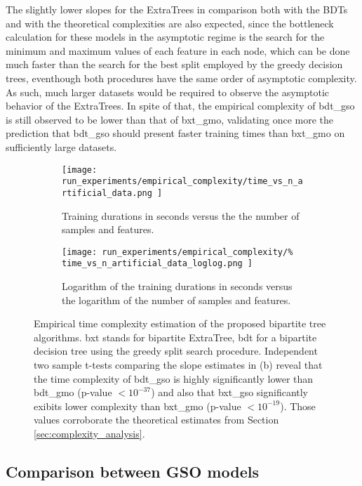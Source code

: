 The slightly lower slopes for the ExtraTrees in comparison both with the BDTs and with the theoretical complexities are also expected, since the bottleneck calculation for these models in the asymptotic regime is the search for the minimum and maximum values of each feature in each node, which can be done much faster than the search for the best split employed by the greedy decision trees, eventhough both procedures have the same order of asymptotic complexity. As such, much larger datasets would be required to observe the asymptotic behavior of the ExtraTrees. In spite of that, the empirical complexity of bdt\_gso is still observed to be lower than that of bxt\_gmo, validating once more the prediction that bdt\_gso should present faster training times than bxt\_gmo on sufficiently large datasets.

\begin{figure}[h]
    \centering
    \begin{subfigure}{0.5\textwidth}
        \texttt{[image: 
            run\_experiments/empirical\_complexity/time\_vs\_n\_artificial\_data.png
        ]}
        \caption{Training durations in seconds versus the the number of samples and features.}
    \end{subfigure}
    \begin{subfigure}{0.5\textwidth}
        \texttt{[image: 
            run\_experiments/empirical\_complexity/\%
            time\_vs\_n\_artificial\_data\_loglog.png
        ]}
        \caption{Logarithm of the training durations in seconds versus the logarithm of the number of samples and features.}
    \end{subfigure}
    \caption{
        Empirical time complexity estimation of the proposed bipartite tree
        algorithms. bxt stands for bipartite ExtraTree, bdt for a bipartite decision tree using the greedy split search procedure. Independent two sample t-tests comparing the slope estimates in (b) reveal that the time complexity of bdt\_gso is highly significantly lower than bdt\_gmo (p-value $< 10^{-37}$) and also that bxt\_gso significantly exibits lower complexity than bxt\_gmo (p-value $< 10^{-19}$). Those values
        corroborate the theoretical estimates from Section \ref{sec:complexity_analysis}.
    }
    \label{fig:empirical_complexity}
\end{figure}

\subsection{Comparison between GSO models}


